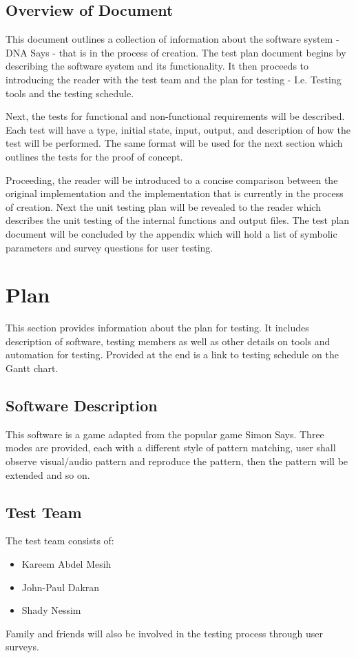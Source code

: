 \documentclass[12pt, titlepage]{article}
\begin{document}
\subsection{Overview of Document}

\par This document outlines a collection of information about the software system - DNA Says - that is in the process of creation. The test plan document begins by describing the software system and its functionality. It then proceeds to introducing the reader with the test team and the plan for testing - I.e. Testing tools and the testing schedule.
\\
\par Next, the tests for functional and non-functional requirements will be described. Each test will have a type, initial state, input, output, and description of how the test will be performed. The same format will be used for the next section which outlines the tests for the proof of concept.
\\
\par Proceeding, the reader will be introduced to a concise comparison between the original implementation and the implementation that is currently in the process of creation. Next the unit testing plan will be revealed to the reader which describes the unit testing of the internal functions and output files. The test plan document will be concluded by the appendix which will hold a list of symbolic parameters and survey questions for user testing.


\section{Plan}
\par This section provides information about the plan for testing. It includes description of software, testing members as well as other details on tools and automation for testing. Provided at the end is a link to testing schedule on the Gantt chart.
\subsection{Software Description}
This software is a game adapted from the popular game Simon Says. Three modes are provided, each with a different style of pattern matching, user shall observe visual/audio pattern  and reproduce the pattern, then the pattern will be extended and so on.
\subsection{Test Team}
The test team consists of:
\begin{itemize}
  \item Kareem Abdel Mesih
  \item John-Paul Dakran
  \item Shady Nessim
\end{itemize}
Family and friends will also be involved in the testing process through user surveys.
\end{document}
